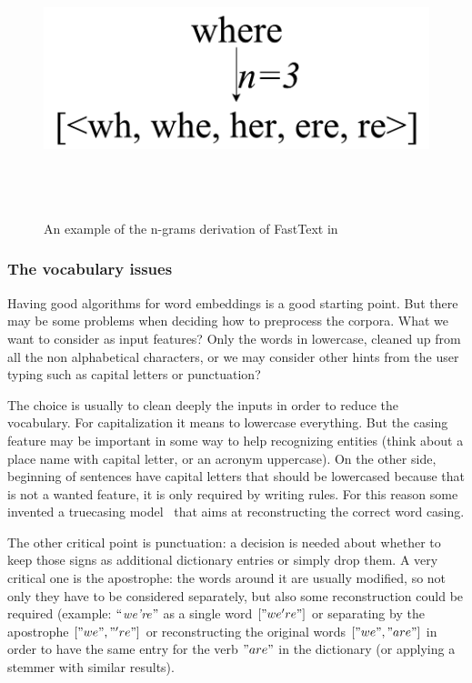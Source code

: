 
\begin{figure}[!htbp]
    \centering
    \includegraphics[max width=\linewidth,max height=8cm,keepaspectratio]{figures/fastText}
    \caption{An example of the n-grams derivation of FastText in~\cite{bojanowski2016enriching}}\label{fig:fastText}
\end{figure}

\subsubsection{The vocabulary issues}
\label{soaVocabulary}

Having good algorithms for word embeddings is a good starting point. But there may be some problems when deciding how to preprocess the corpora. What we want to consider as input features? Only the words in lowercase, cleaned up from all the non alphabetical characters, or we may consider other hints from the user typing such as capital letters or punctuation?

The choice is usually to clean deeply the inputs in order to reduce the vocabulary. For capitalization it means to lowercase everything. But the casing feature may be important in some way to help recognizing entities (think about a place name with capital letter, or an acronym uppercase). On the other side, beginning of sentences have capital letters that should be lowercased because that is not a wanted feature, it is only required by writing rules. For this reason some invented a truecasing model~\cite{lita2003truecasing} that aims at reconstructing the correct word casing.

The other critical point is punctuation: a decision is needed about whether to keep those signs as additional dictionary entries or simply drop them. A very critical one is the apostrophe: the words around it are usually modified, so not only they have to be considered separately, but also some reconstruction could be required (example: $``$\textit{we're}$"$  as a single word  \(  \left[ "we're" \right]  \)  or separating by the apostrophe  \(  \left[ "we", "'re" \right]  \)  or reconstructing the original words  \(  \left[ "we", "are" \right]  \)  in order to have the same entry for the verb  \( "are" \)  in the dictionary (or applying a stemmer with similar results).

